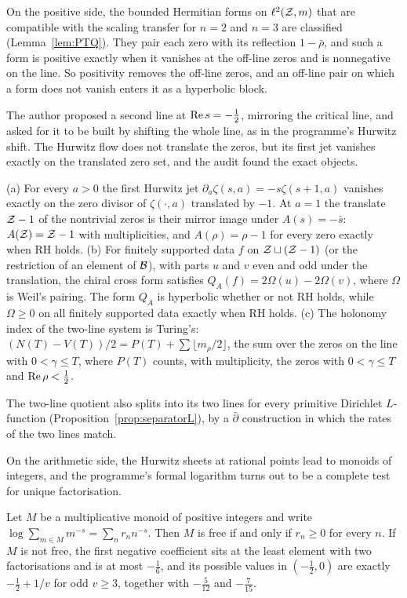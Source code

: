 On the positive side, the bounded Hermitian forms on $\ell^2(\mathcal{Z},m)$ that are compatible with the scaling transfer for $n=2$ and $n=3$ are classified (Lemma~\ref{lem:PTQ}). They pair each zero with its reflection $1-\bar\rho$, and such a form is positive exactly when it vanishes at the off-line zeros and is nonnegative on the line. So positivity removes the off-line zeros, and an off-line pair on which a form does not vanish enters it as a hyperbolic block.

The author proposed a second line at $\operatorname{Re} s=-\tfrac12$, mirroring the critical line, and asked for it to be built by shifting the whole line, as in the programme's Hurwitz shift. The Hurwitz flow does not translate the zeros, but its first jet vanishes exactly on the translated zero set, and the audit found the exact objects.

\begin{introthm}
(a) For every $a>0$ the first Hurwitz jet $\partial_a\zeta(s,a)=-s\zeta(s+1,a)$ vanishes exactly on the zero divisor of $\zeta(\cdot,a)$ translated by $-1$. At $a=1$ the translate $\mathcal{Z}-1$ of the nontrivial zeros is their mirror image under $A(s)=-\bar s$: $A(\mathcal{Z})=\mathcal{Z}-1$ with multiplicities, and $A(\rho)=\rho-1$ for every zero exactly when RH holds.
(b) For finitely supported data $f$ on $\mathcal{Z}\sqcup(\mathcal{Z}-1)$ (or the restriction of an element of $\mathcal{B}$), with parts $u$ and $v$ even and odd under the translation, the chiral cross form satisfies $Q_A(f)=2\Omega(u)-2\Omega(v)$, where $\Omega$ is Weil's pairing. The form $Q_A$ is hyperbolic whether or not RH holds, while $\Omega\ge0$ on all finitely supported data exactly when RH holds.
(c) The holonomy index of the two-line system is Turing's: $(N(T)-V(T))/2=P(T)+\sum\lfloor m_\rho/2\rfloor$, the sum over the zeros on the line with $0<\gamma\le T$, where $P(T)$ counts, with multiplicity, the zeros with $0<\gamma\le T$ and $\operatorname{Re}\rho<\tfrac12$.
\end{introthm}

The two-line quotient also splits into its two lines for every primitive Dirichlet $L$-function (Proposition~\ref{prop:separatorL}), by a $\bar\partial$ construction in which the rates of the two lines match.

On the arithmetic side, the Hurwitz sheets at rational points lead to monoids of integers, and the programme's formal logarithm turns out to be a complete test for unique factorisation.

\begin{introthm}
Let $M$ be a multiplicative monoid of positive integers and write $\log\sum_{m\in M}m^{-s}=\sum_nr_nn^{-s}$. Then $M$ is free if and only if $r_n\ge0$ for every $n$. If $M$ is not free, the first negative coefficient sits at the least element with two factorisations and is at most $-\tfrac16$, and its possible values in $(-\tfrac12,0)$ are exactly $-\tfrac12+1/v$ for odd $v\ge3$, together with $-\tfrac5{12}$ and $-\tfrac7{15}$.
\end{introthm}

